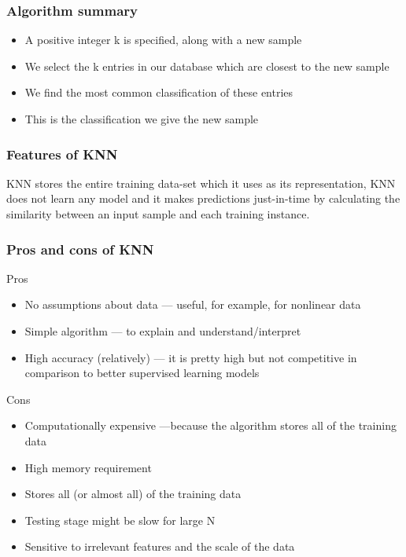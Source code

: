 \subsubsection{Algorithm summary}
\begin{itemize}
    \item A positive integer k is specified, along with a new sample
    \item We select the k entries in our database which are closest to the new sample
    \item We find the most common classification of these entries
    \item This is the classification we give the new sample
\end{itemize}
\subsubsection{Features of KNN}
KNN stores the entire training data-set which it uses as its representation, KNN does not learn any model and it makes predictions just-in-time by calculating the similarity between an input sample and each training instance.
\subsubsection{Pros and cons of KNN}
Pros
\begin{itemize}
    \item No assumptions about data — useful, for example, for nonlinear data
    \item Simple algorithm — to explain and understand/interpret
    \item High accuracy (relatively) — it is pretty high but not competitive in comparison to better supervised learning models
\end{itemize}
Cons
\begin{itemize}
    \item Computationally expensive —because the algorithm stores all of the training data
    \item High memory requirement
    \item Stores all (or almost all) of the training data
    \item Testing stage might be slow for large N
    \item Sensitive to irrelevant features and the scale of the data
\end{itemize}